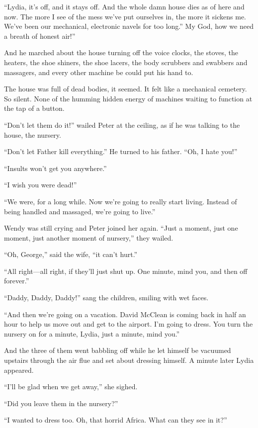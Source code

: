\documentclass[10pt,a4paper]{article}
\newcommand{\glos}[3]{\dotuline{#1}\marginpar{\scriptsize\textit{#3} #2}}
\begin{document}
“Lydia, it’s off, and it stays off. And the whole damn house dies as of here and now. The more I see of the mess we’ve put ourselves in, the more it sickens me. We’ve been \glos{contemplating}{thinking deeply about}{v.} our mechanical, electronic navels for too long.” My God, how we need a breath of honest air!”

And he marched about the house turning off the voice clocks, the stoves, the heaters, the shoe shiners, the shoe lacers, the body scrubbers and swabbers and massagers, and every other machine be could put his hand to.

The house was full of dead bodies, it seemed. It felt like a mechanical cemetery. So silent. None of the humming hidden energy of machines waiting to function at the tap of a button.

“Don’t let them do it!” wailed Peter at the ceiling, as if he was talking to the house, the nursery.

“Don’t let Father kill everything.” He turned to his father. “Oh, I hate you!”

“Insults won’t get you anywhere.”

“I wish you were dead!”

“We were, for a long while. Now we’re going to really start living. Instead of being handled and massaged, we’re going to live.”

Wendy was still crying and Peter joined her again. “Just a moment, just one moment, just another moment of nursery,” they wailed.

“Oh, George,” said the wife, “it can’t hurt.”

“All right—all right, if they’ll just shut up. One minute, mind you, and then off forever.”

“Daddy, Daddy, Daddy!” sang the children, smiling with wet faces.

“And then we’re going on a vacation. David McClean is coming back in half an hour to help us move out and get to the airport. I’m going to dress. You turn the nursery on for a minute, Lydia, just a minute, mind you.”

And the three of them went babbling off while he let himself be vacuumed upstairs through the air flue and set about dressing himself. A minute later Lydia appeared.

“I’ll be glad when we get away,” she sighed.

“Did you leave them in the nursery?”

“I wanted to dress too. Oh, that horrid Africa. What can they see in it?”
\end{document}
